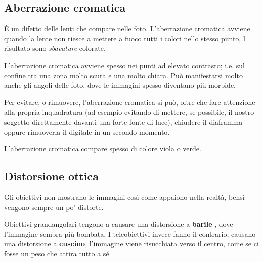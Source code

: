\subsection{Aberrazione cromatica} \label{subsec:abberrazione}
È un difetto delle lenti che compare nelle foto. L'aberrazione cromatica avviene quando la lente non riesce a mettere a fuoco tutti i colori nello stesso punto, l risultato sono \textit{sbavature} colorate.

L'aberrazione cromatica avviene spesso nei punti ad elevato contrasto; i.e. sul confine tra una zona molto scura e una molto chiara.
Può manifestarsi molto anche gli angoli delle foto, dove le immagini spesso diventano più morbide.

Per evitare, o rimuovere, l'aberrazione cromatica si può, oltre che fare attenzione alla propria inquadratura (ad esempio evitando di mettere, se possibile, il nostro soggetto direttamente davanti una forte fonte di luce),
chiudere il diaframma oppure rimuoverla il digitale in un secondo momento.

L'aberrazione cromatica compare spesso di colore viola o verde.


\subsection{Distorsione ottica} \label{subsec:distorsioneottica}
Gli obiettivi non mostrano le immagini così come appaiono nella realtà, bensì vengono sempre un po' distorte.

Obiettivi grandangolari tengono a causare una distorsione a \textbf{barile} \label{def:distorsionebarile}, dove l'immagine sembra più bombata.
I teleobiettivi invece fanno il contrario, causano una distorsione a \textbf{cuscino}\label{def:distorsionecuscino}, l'immagine viene risucchiata verso il centro, come se ci fosse un peso che attira tutto a sé.